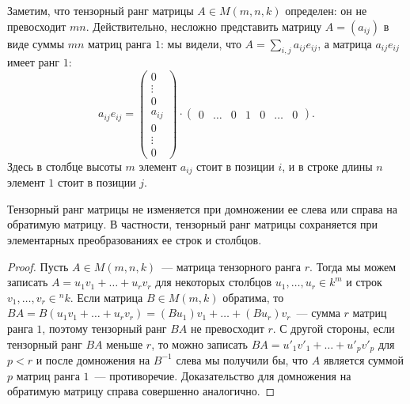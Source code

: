 Заметим, что тензорный ранг матрицы $A\in M(m,n,k)$ определен: он не
превосходит $mn$. Действительно, несложно представить матрицу
$A=(a_{ij})$ в виде суммы $mn$ матриц ранга $1$: мы видели, что
$A=\sum_{i,j}a_{ij}e_{ij}$, а матрица $a_{ij}e_{ij}$ имеет ранг $1$:
$$
a_{ij}e_{ij} = \begin{pmatrix}0 \\ \vdots \\ 0 \\ a_{ij} \\ 0 \\
  \vdots \\ 0\end{pmatrix}\cdot\begin{pmatrix}0 & \dots & 0 & 1 & 0 &
  \dots & 0\end{pmatrix}.
$$
Здесь в столбце высоты $m$ элемент $a_{ij}$ стоит в позиции $i$, и в
строке длины $n$ элемент $1$ стоит в позиции $j$.

\begin{theorem}
Тензорный ранг матрицы не изменяется при домножении ее слева или
справа на обратимую матрицу. В частности, тензорный ранг матрицы
сохраняется при элементарных преобразованиях ее строк и столбцов.
\end{theorem}
\begin{proof}
Пусть $A\in M(m,n,k)$~--- матрица тензорного ранга $r$. Тогда мы можем
записать $A=u_1v_1+\dots+u_rv_r$ для некоторых столбцов
$u_1,\dots,u_r\in k^m$ и строк $v_1,\dots,v_r\in {}^nk$.
Если матрица $B\in M(m,k)$ обратима, то
$BA=B(u_1v_1+\dots+u_rv_r)=(Bu_1)v_1+\dots+(Bu_r)v_r$~--- сумма $r$
матриц ранга $1$, поэтому тензорный ранг $BA$ не превосходит $r$. С
другой стороны, если тензорный ранг $BA$ меньше $r$, то можно записать
$BA=u'_1v'_1+\dots+u'_pv'_p$ для $p<r$ и после домножения на $B^{-1}$
слева мы получили бы, что $A$ является суммой $p$ матриц ранга $1$~---
противоречие. Доказательство для домножения на обратимую матрицу
справа совершенно аналогично.
\end{proof}

